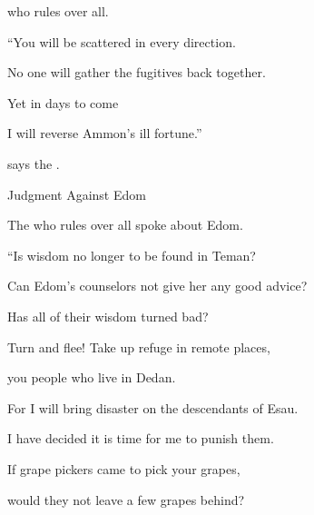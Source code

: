 {{}
who rules over all.
\par }{\Q “You will be scattered
in every direction.
\par }{\Q No
one will gather
the fugitives back together.
\par }{\Q {}Yet in days to come
\par }{\Q I will reverse
Ammon’s
ill fortune.”
\par }{\Q says
the {}.
\par }{\SH Judgment Against Edom
\par }{\PP {}The
{}
who rules over all
spoke
about Edom.
\par }{\Q “Is wisdom
no
longer
to be found in Teman?

\par }{\Q Can Edom’s counselors not give her any good
advice?

\par }{\Q Has all of their wisdom
turned bad?
\par }{\Q {}Turn
and flee! Take up refuge in remote places,
\par }{\Q you people who
live
in Dedan.
\par }{\Q For
I will bring
disaster
on the descendants of Esau.
\par }{\Q I have decided
it
is time
for me to punish them.
\par }{\Q {}If
grape pickers
came
to pick your grapes,
\par }{\Q would they not
leave
a few grapes behind?

}
